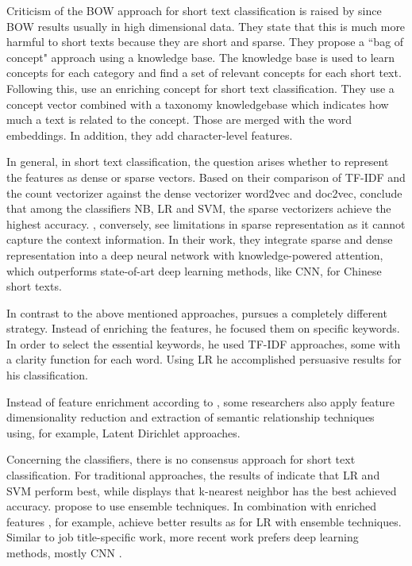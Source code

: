 \documentclass[12pt, a4paper, titlepage]{article}
\begin{document}
Criticism of the \ac{BOW} approach for short text classification is raised by \citet{WangF2014} since \ac{BOW} results usually in high dimensional data. They state that this is much more harmful to short texts because they are short and sparse. They propose a ``bag of concept" approach using a knowledge base. The knowledge base is used to learn concepts for each category and find a set of relevant concepts for each short text. Following this, \citet{wang2017J} use an enriching concept for short text classification. They use a concept vector combined with a taxonomy knowledgebase which indicates how much a text is related to the concept. Those are merged with the word embeddings. In addition, they add character-level features. 

In general, in short text classification, the question arises whether to represent the features as dense or sparse vectors. Based on their comparison of \ac{TF-IDF} and the count vectorizer against the dense vectorizer word2vec and doc2vec, \cite{WangY2017} conclude that among the classifiers \ac{NB}, \ac{LR} and \ac{SVM}, the sparse vectorizers achieve the highest accuracy. \cite{Chen2019}, conversely, see limitations in sparse representation as it cannot capture the context information. In their work, they integrate sparse and dense representation into a deep neural network with knowledge-powered attention, which outperforms state-of-art deep learning methods, like \ac{CNN}, for Chinese short texts. 

In contrast to the above mentioned approaches, \citet{sun2012}pursues a completely different strategy. Instead of enriching the features, he focused them on specific keywords. In order to select the essential keywords, he used \ac{TF-IDF} approaches, some with a clarity function for each word. Using \ac{LR} he accomplished persuasive results for his classification.

Instead of feature enrichment according to \citet{Song2014}, some researchers also apply feature dimensionality reduction and extraction of semantic relationship techniques using, for example, Latent Dirichlet approaches.

Concerning the classifiers, there is no consensus approach for short text classification. For traditional approaches, the results of \cite{WangY2017} indicate that \ac{LR} and \ac{SVM} perform best, while \cite{Khamar2013} displays that k-nearest neighbor has the best achieved accuracy. \citet{Song2014} propose to use ensemble techniques. In combination with enriched features \citet{Bouaziz2014}, for example, achieve better results as for \ac{LR} with ensemble techniques. Similar to job title-specific work, more recent work prefers deep learning methods, mostly \ac{CNN} \citep{Chen2019}. 
\end{document}
